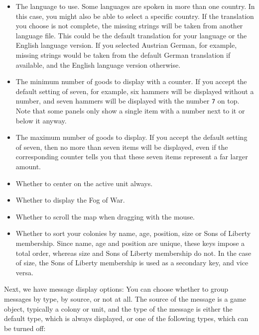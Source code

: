 \documentclass[12pt]{article}
\begin{document}
\begin{itemize}
\item The language to use. Some languages are spoken in
more than one country. In this case, you might also be able to select
a specific country. If the translation you choose is not complete, the
missing strings will be taken from another language file. This could
be the default translation for your language or the English language
version. If you selected Austrian German, for example, missing strings
would be taken from the default German translation if available, and
the English language version otherwise.
\item The minimum number of goods to display with a counter. If you
accept the default setting of seven, for example, six hammers will be
displayed without a number, and seven hammers will be displayed with
the number \verb$7$ on top. Note that some panels only show a single
item with a number next to it or below it anyway.
\item The maximum number of goods to display. If you accept the
default setting of seven, then no more than seven items will be
displayed, even if the corresponding counter tells you that these
seven items represent a far larger amount.
\item Whether to center on the active unit always.
\item Whether to display the Fog of War.
\item Whether to scroll the map when dragging with the mouse.
\item Whether to sort your colonies by name, age, position, size or
Sons of Liberty membership. Since name, age and position are unique,
these keys impose a total order, whereas size and Sons of Liberty
membership do not. In the case of size, the Sons of Liberty membership
is used as a secondary key, and vice versa.
\end{itemize}

Next, we have message display options: You can choose whether to group
messages by type, by source, or not at all. The source of the message
is a game object, typically a colony or unit, and the type of the
message is either the default type, which is always displayed, or one
of the following types, which can be turned off:
\end{document}

